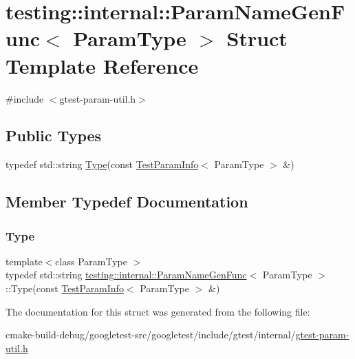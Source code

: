 \hypertarget{structtesting_1_1internal_1_1ParamNameGenFunc}{}\section{testing\+::internal\+::Param\+Name\+Gen\+Func$<$ Param\+Type $>$ Struct Template Reference}
\label{structtesting_1_1internal_1_1ParamNameGenFunc}


{\ttfamily \#include $<$gtest-\/param-\/util.\+h$>$}

\subsection*{Public Types}
\begin{DoxyCompactItemize}
\item 
typedef std\+::string \mbox{\hyperlink{structtesting_1_1internal_1_1ParamNameGenFunc_adf1ce5df22a930ae715082862d72590f}{Type}}(const \mbox{\hyperlink{structtesting_1_1TestParamInfo}{Test\+Param\+Info}}$<$ Param\+Type $>$ \&)
\end{DoxyCompactItemize}


\subsection{Member Typedef Documentation}
\mbox{\label{structtesting_1_1internal_1_1ParamNameGenFunc_adf1ce5df22a930ae715082862d72590f}} 
\subsubsection{\texorpdfstring{Type}{Type}}
{\footnotesize\ttfamily template$<$class Param\+Type $>$ \\
typedef std\+::string \mbox{\hyperlink{structtesting_1_1internal_1_1ParamNameGenFunc}{testing\+::internal\+::\+Param\+Name\+Gen\+Func}}$<$ Param\+Type $>$\+::Type(const \mbox{\hyperlink{structtesting_1_1TestParamInfo}{Test\+Param\+Info}}$<$ Param\+Type $>$ \&)}



The documentation for this struct was generated from the following file\+:\begin{DoxyCompactItemize}
\item 
cmake-\/build-\/debug/googletest-\/src/googletest/include/gtest/internal/\mbox{\hyperlink{gtest-param-util_8h}{gtest-\/param-\/util.\+h}}\end{DoxyCompactItemize}
